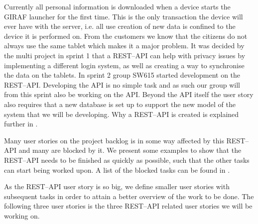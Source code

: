 Currently all personal information is downloaded when a device starts the GIRAF launcher for the first time.
This is the only transaction the device will ever have with the server, i.e. all use creation of new data is confined to the device it is performed on.
From the customers we know that the citizens do not always use the same tablet which makes it a major problem.
It was decided by the multi project in sprint 1 that a REST--API can help with privacy issues by implementing a different login system, as well as creating a way to synchronise the data on the tablets.
In sprint 2 group SW615 started development on the REST--API.
Developing the API is no simple task and as such our group will from this sprint also be working on the API.
Beyond the API itself the user story also requires that a new database is set up to support the new model of the system that we will be developing.
Why a REST--API is created is explained further in .

Many user stories on the project backlog is in some way affected by this REST--API and many are blocked by it.
We present some examples to show that the REST--API needs to be finished as quickly as possible, such that the other tasks can start being worked upon.
A list of the blocked tasks can be found in . 

As the REST--API user story is so big, we define smaller user stories with subsequent tasks in order to attain a better overview of the work to be done.
The following three user stories is the three REST--API related user stories we will be working on.

